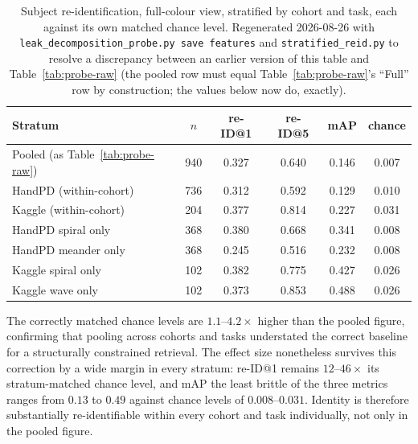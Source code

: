 \documentclass[3p,final,10pt]{elsarticle}
\begin{document}
\begin{table}[H]
\centering
\caption{Subject re-identification, full-colour view, stratified by
cohort and task, each against its own matched chance level. Regenerated
2026-08-26 with \texttt{leak\_decomposition\_probe.py save features} and
\texttt{stratified\_reid.py} to resolve a discrepancy between an earlier
version of this table and Table~\ref{tab:probe-raw} (the pooled row must
equal Table~\ref{tab:probe-raw}'s ``Full'' row by construction; the values
below now do, exactly).}
\label{tab:reid-strat}
\begin{tabular}{lccccc}
\toprule
Stratum & $n$ & re-ID@1 & re-ID@5 & mAP & chance \\
\midrule
Pooled (as Table~\ref{tab:probe-raw}) & 940 & 0.327 & 0.640 & 0.146 & 0.007 \\
HandPD (within-cohort)  & 736 & 0.312 & 0.592 & 0.129 & 0.010 \\
Kaggle (within-cohort)  & 204 & 0.377 & 0.814 & 0.227 & 0.031 \\
HandPD spiral only      & 368 & 0.380 & 0.668 & 0.341 & 0.008 \\
HandPD meander only     & 368 & 0.245 & 0.516 & 0.232 & 0.008 \\
Kaggle spiral only      & 102 & 0.382 & 0.775 & 0.427 & 0.026 \\
Kaggle wave only        & 102 & 0.373 & 0.853 & 0.488 & 0.026 \\
\bottomrule
\end{tabular}
\end{table}

The correctly matched chance levels are $1.1$--$4.2\times$ higher than the
pooled figure, confirming that pooling across cohorts and tasks understated
the correct baseline for a structurally constrained retrieval. The effect
size nonetheless survives this correction by a wide margin in every
stratum: re-ID@1 remains $12$--$46\times$ its stratum-matched chance
level, and mAP the least brittle of the three metrics ranges from
$0.13$ to $0.49$ against chance levels of $0.008$--$0.031$. Identity is
therefore substantially re-identifiable within every cohort and task
individually, not only in the pooled figure.
\end{document}
